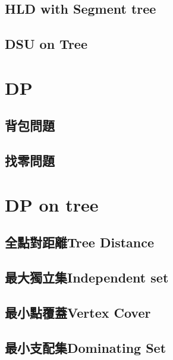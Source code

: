 \subsection{HLD with Segment tree}


\subsection{DSU on Tree}


\section{DP}

\subsection{背包問題}


\subsection{找零問題}


\section{DP on tree}

\subsection{全點對距離Tree Distance}


\subsection{最大獨立集Independent set}


\subsection{最小點覆蓋Vertex Cover}


\subsection{最小支配集Dominating Set}


